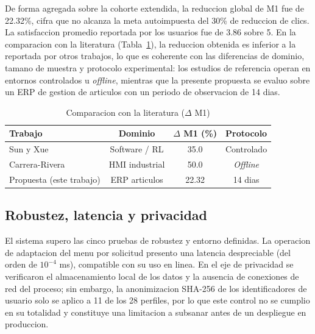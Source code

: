 \documentclass[conference]{IEEEtran}
\begin{document}
De forma agregada sobre la cohorte extendida, la reduccion global de M1 fue de 22.32\%, cifra que no alcanza la meta autoimpuesta del 30\% de reduccion de clics. La satisfaccion promedio reportada por los usuarios fue de 3.86 sobre 5. En la comparacion con la literatura (Tabla~\ref{tab_bench}), la reduccion obtenida es inferior a la reportada por otros trabajos, lo que es coherente con las diferencias de dominio, tamano de muestra y protocolo experimental: los estudios de referencia operan en entornos controlados u \textit{offline}, mientras que la presente propuesta se evaluo sobre un ERP de gestion de articulos con un periodo de observacion de 14 dias.

\begin{table}[htbp]
\caption{Comparacion con la literatura ($\Delta$ M1)}
\begin{center}
\begin{tabular}{lccc}
\toprule
\textbf{Trabajo} & \textbf{Dominio} & \textbf{$\Delta$ M1 (\%)} & \textbf{Protocolo} \\
\midrule
Sun y Xue \cite{b_sunxue}       & Software / RL   & 35.0 & Controlado \\
Carrera-Rivera \cite{b_carrera} & HMI industrial  & 50.0 & \textit{Offline} \\
Propuesta (este trabajo)        & ERP articulos   & 22.32 & 14 dias \\
\bottomrule
\end{tabular}
\label{tab_bench}
\end{center}
\end{table}

\subsection{Robustez, latencia y privacidad}
El sistema supero las cinco pruebas de robustez y entorno definidas. La operacion de adaptacion del menu por solicitud presento una latencia despreciable (del orden de $10^{-4}$ ms), compatible con su uso en linea. En el eje de privacidad se verificaron el almacenamiento local de los datos y la ausencia de conexiones de red del proceso; sin embargo, la anonimizacion SHA-256 de los identificadores de usuario solo se aplico a 11 de los 28 perfiles, por lo que este control no se cumplio en su totalidad y constituye una limitacion a subsanar antes de un despliegue en produccion.
\end{document}
